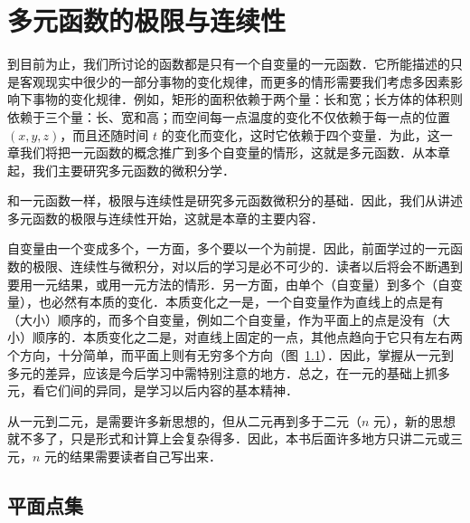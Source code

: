 \chapter{多元函数的极限与连续性}

到目前为止，我们所讨论的函数都是只有一个自变量的一元函数．它所能描述的只是客观现实中很少的一部分事物的变化规律，而更多的情形需要我们考虑多因素影响下事物的变化规律．例如，矩形的面积依赖于两个量：长和宽；长方体的体积则依赖于三个量：长、宽和高；而空间每一点温度的变化不仅依赖于每一点的位置 $(x,y,z)$，而且还随时间 $t$ 的变化而变化，这时它依赖于四个变量．为此，这一章我们将把一元函数的概念推广到多个自变量的情形，这就是多元函数．从本章起，我们主要研究多元函数的微积分学．

和一元函数一样，极限与连续性是研究多元函数微积分的基础．因此，我们从讲述多元函数的极限与连续性开始，这就是本章的主要内容．

自变量由一个变成多个，一方面，多个要以一个为前提．因此，前面学过的一元函数的极限、连续性与微积分，对以后的学习是必不可少的．读者以后将会不断遇到要用一元结果，或用一元方法的情形．另一方面，由单个（自变量）到多个（自变量），也必然有本质的变化．本质变化之一是，一个自变量作为直线上的点是有（大小）顺序的，而多个自变量，例如二个自变量，作为平面上的点是没有（大小）顺序的．本质变化之二是，对直线上固定的一点，其他点趋向于它只有左右两个方向，十分简单，而平面上则有无穷多个方向（图~\ref{fig:15-1}）．因此，掌握从一元到多元的差异，应该是今后学习中需特别注意的地方．总之，在一元的基础上抓多元，看它们间的异同，是学习以后内容的基本精神．

\begin{figure}[htbp]
\centering
{}\caption{\relax}\label{fig:15-1}
\end{figure}

从一元到二元，是需要许多新思想的，但从二元再到多于二元（$n$ 元），新的思想就不多了，只是形式和计算上会复杂得多．因此，本书后面许多地方只讲二元或三元，$n$ 元的结果需要读者自己写出来．

\section{平面点集}

